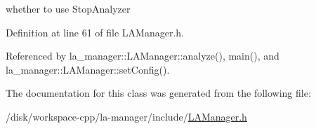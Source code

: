 whether to use StopAnalyzer 



Definition at line 61 of file LAManager.h.

Referenced by la\_\-manager::LAManager::analyze(), main(), and la\_\-manager::LAManager::setConfig().

The documentation for this class was generated from the following file:\begin{CompactItemize}
\item 
/disk/workspace-cpp/la-manager/include/\hyperlink{LAManager_8h}{LAManager.h}\end{CompactItemize}
